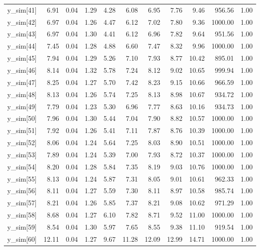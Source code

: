 \begin{table}[ht]
\begin{tabular}{rrrrrrrrrrr}
  y\_sim[41] & 6.91 & 0.04 & 1.29 & 4.28 & 6.08 & 6.95 & 7.76 & 9.46 & 956.56 & 1.00 \\ 
  y\_sim[42] & 6.97 & 0.04 & 1.26 & 4.47 & 6.12 & 7.02 & 7.80 & 9.36 & 1000.00 & 1.00 \\ 
  y\_sim[43] & 6.97 & 0.04 & 1.30 & 4.41 & 6.12 & 6.96 & 7.82 & 9.64 & 951.56 & 1.00 \\ 
  y\_sim[44] & 7.45 & 0.04 & 1.28 & 4.88 & 6.60 & 7.47 & 8.32 & 9.96 & 1000.00 & 1.00 \\ 
  y\_sim[45] & 7.94 & 0.04 & 1.29 & 5.26 & 7.10 & 7.93 & 8.77 & 10.42 & 895.01 & 1.00 \\ 
  y\_sim[46] & 8.14 & 0.04 & 1.32 & 5.78 & 7.24 & 8.12 & 9.02 & 10.65 & 999.94 & 1.00 \\ 
  y\_sim[47] & 8.25 & 0.04 & 1.27 & 5.70 & 7.42 & 8.23 & 9.15 & 10.66 & 966.59 & 1.00 \\ 
  y\_sim[48] & 8.13 & 0.04 & 1.26 & 5.74 & 7.25 & 8.13 & 8.98 & 10.67 & 934.72 & 1.00 \\ 
  y\_sim[49] & 7.79 & 0.04 & 1.23 & 5.30 & 6.96 & 7.77 & 8.63 & 10.16 & 934.73 & 1.00 \\ 
  y\_sim[50] & 7.96 & 0.04 & 1.30 & 5.44 & 7.04 & 7.90 & 8.82 & 10.57 & 1000.00 & 1.00 \\ 
  y\_sim[51] & 7.92 & 0.04 & 1.26 & 5.41 & 7.11 & 7.87 & 8.76 & 10.39 & 1000.00 & 1.00 \\ 
  y\_sim[52] & 8.06 & 0.04 & 1.24 & 5.64 & 7.25 & 8.03 & 8.90 & 10.51 & 1000.00 & 1.00 \\ 
  y\_sim[53] & 7.89 & 0.04 & 1.24 & 5.39 & 7.00 & 7.93 & 8.72 & 10.37 & 1000.00 & 1.00 \\ 
  y\_sim[54] & 8.20 & 0.04 & 1.28 & 5.84 & 7.35 & 8.19 & 9.03 & 10.76 & 1000.00 & 1.00 \\ 
  y\_sim[55] & 8.13 & 0.04 & 1.24 & 5.87 & 7.31 & 8.05 & 9.01 & 10.61 & 962.33 & 1.00 \\ 
  y\_sim[56] & 8.11 & 0.04 & 1.27 & 5.59 & 7.30 & 8.11 & 8.97 & 10.58 & 985.74 & 1.00 \\ 
  y\_sim[57] & 8.21 & 0.04 & 1.26 & 5.85 & 7.37 & 8.21 & 9.08 & 10.62 & 971.29 & 1.00 \\ 
  y\_sim[58] & 8.68 & 0.04 & 1.27 & 6.10 & 7.82 & 8.71 & 9.52 & 11.00 & 1000.00 & 1.00 \\ 
  y\_sim[59] & 8.54 & 0.04 & 1.30 & 5.97 & 7.65 & 8.55 & 9.38 & 11.10 & 919.54 & 1.00 \\ 
  y\_sim[60] & 12.11 & 0.04 & 1.27 & 9.67 & 11.28 & 12.09 & 12.99 & 14.71 & 1000.00 & 1.00 \\ 

\end{tabular}
\end{table}
